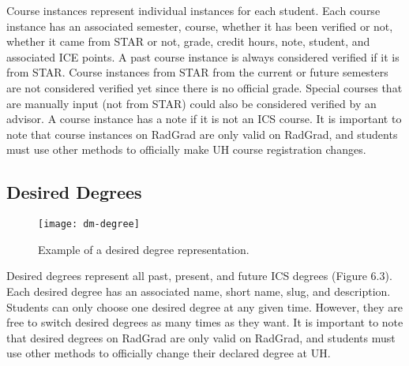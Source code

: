 Course instances represent individual instances for each student. Each course instance has an associated semester, course, whether it has been verified or not, whether it came from STAR or not, grade, credit hours, note, student, and associated ICE points. A past course instance is always considered verified if it is from STAR. Course instances from STAR from the current or future semesters are not considered verified yet since there is no official grade. Special courses that are manually input (not from STAR) could also be considered verified by an advisor. A course instance has a note if it is not an ICS course. It is important to note that course instances on RadGrad are only valid on RadGrad, and students must use other methods to officially make UH course registration changes.

\subsection{Desired Degrees}
\begin{figure}[htbp!]
\centering
\texttt{[image: dm-degree]}
\caption{Example of a desired degree representation.}
\end{figure}
Desired degrees represent all past, present, and future ICS degrees (Figure 6.3). Each desired degree has an associated name, short name, slug, and description. Students can only choose one desired degree at any given time. However, they are free to switch desired degrees as many times as they want. It is important to note that desired degrees on RadGrad are only valid on RadGrad, and students must use other methods to officially change their declared degree at UH. 

